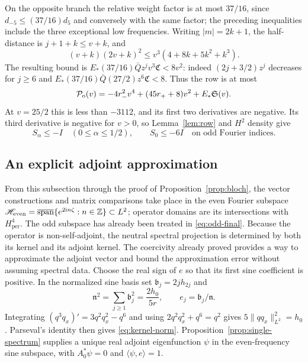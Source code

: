 \documentclass[a4paper,11pt]{article}
\numberwithin{equation}{section}
\theoremstyle{definition}
\theoremstyle{remark}
\newcommand{\Z}{\mathbb Z}
\newcommand{\ii}{\mathrm i}
\newcommand{\per}{\mathrm{per}}
\newcommand{\norm}[1]{\lVert#1\rVert}
\newcommand{\ip}[2]{\langle#1,#2\rangle}
\begin{document}
On the opposite branch the relative weight factor is at most $37/16$, since $d_{-5}\le(37/16)d_5$ and conversely with the same factor; the preceding inequalities include the three exceptional low frequencies. Writing $|m|=2k+1$, the half-distance is $j+1+k\le v+k$, and
\[
 (v+k)(2v+k)^2\le v^3(4+8k+5k^2+k^3).
\]
The resulting bound is $E_*(37/16)\bar Qz^jv^3\mathfrak C<8v^2$: indeed $(2j+3/2)z^j$ decreases for $j\ge6$ and $E_*(37/16)\bar Q(27/2)z^6\mathfrak C<8$. Thus the row is at most
\begin{equation}\label{eq:odd-high}
 \mathcal P_{\rm o}(v)=-4r_-^2v^4+(45r_++8)v^2+E_*\mathfrak S(v).
\end{equation}
At $v=25/2$ this is less than $-3112$, and its first two derivatives are negative. Its third derivative is negative for $v>0$, so Lemma~\ref{lem:row} and $H^2$ density give
\begin{equation}\label{eq:odd-final}
 S_\alpha\le-I\quad(0\le\alpha\le1/2),\qquad S_0\le-6I
 \quad\text{on odd Fourier indices}.
\end{equation}

\subsection{An explicit adjoint approximation}
From this subsection through the proof of Proposition~\ref{prop:bloch}, the vector constructions and matrix comparisons take place in the even Fourier subspace $\mathscr H_{\rm even}=\overline{\operatorname{span}}\{e^{2\ii n\zeta}:n\in\Z\}\subset L^2$; operator domains are its intersections with $H^4_\per$. The odd subspace has already been treated in \eqref{eq:odd-final}. Because the operator is non-self-adjoint, the neutral spectral projection is determined by both its kernel and its adjoint kernel. The coercivity already proved provides a way to approximate the adjoint vector and bound the approximation error without assuming spectral data.
Choose the real sign of $e$ so that its first sine coefficient is positive.
In the normalized sine basis set $\mathfrak b_j=2jh_{2j}$ and
\begin{equation}\label{eq:kernel-norm}
 \mathfrak n^2=\sum_{j\ge1}\mathfrak b_j^2=\frac{2h_0}{5r},\qquad
 e_j=\mathfrak b_j/\mathfrak n.
\end{equation}
Integrating $(q^3q_x)'=3q^2q_x^2-q^6$ and using $2q^2q_x^2+q^6=q^2$ gives $5\norm{qq_x}_{L^2}^2=h_0$. Parseval's identity then gives \eqref{eq:kernel-norm}. Proposition~\ref{prop:single-spectrum} supplies a unique real adjoint eigenfunction $\psi$ in the even-frequency sine subspace, with $A_0^*\psi=0$ and $\ip\psi e=1$.
\end{document}
